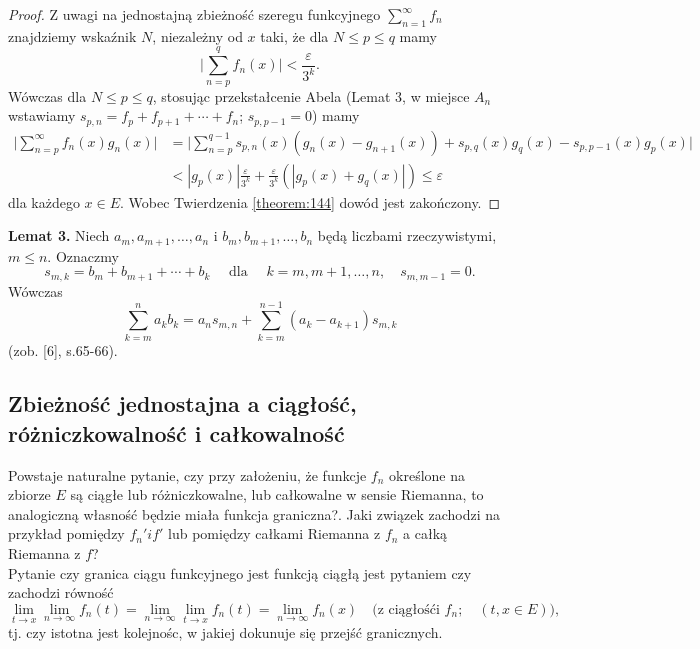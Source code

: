 \documentclass[leqno]{article}
\begin{document}
\begin{justify}
\begin{proof}
    Z uwagi na jednostajną zbieżność szeregu funkcyjnego $\sum\limits_{n=1}^{\infty}f_n$ znajdziemy wskaźnik $N$, niezależny od $x$ taki, że dla $N \leqslant p \leqslant q$ mamy
    \[
        \Bigg|\sum_{n=p}^{q}f_n(x)\Bigg| < \frac{\varepsilon}{3^k}.
    \]
    Wówczas dla $N \leqslant p \leqslant q$, stosując przekstałcenie Abela (Lemat 3, w miejsce $A_n$ wstawiamy $s_{p,n} = f_p + f_{p+1} + \cdots + f_n$; $s_{p,{p-1}} = 0$) mamy
    \begin{align*}
        \Bigg|\sum_{n=p}^{\infty}f_n(x)g_n(x)\Bigg| &= \Bigg|\sum_{n=p}^{q-1}s_{p,n}(x)(g_n(x) - g_{n+1}(x)) + s_{p, q}(x)g_q(x) - s_{p, p-1}(x)g_p(x) \Bigg| \\
                                                    &< |g_p(x)|\frac{\varepsilon}{3^k} + \frac{\varepsilon}{3^k}(|g_p(x) + g_q(x)|) \leqslant \varepsilon
    \end{align*}
    dla każdego $x \in E$. Wobec Twierdzenia \ref{theorem:144} dowód jest zakończony.
\end{proof}

\noindent
\textbf{Lemat 3.}
Niech $a_m, a_{m+1}, \ldots, a_n$ i $b_m, b_{m+1}, \ldots, b_n$ będą liczbami rzeczywistymi, $m \leqslant n$. Oznaczmy
\begin{equation*}
    s_{m,k} = b_m + b_{m+1} + \cdots + b_k \quad \text{ dla } \quad k = m, m+1, \ldots, n, \quad s_{m,{m-1}} = 0. 
\end{equation*}
Wówczas
\[
    \sum_{k=m}^{n}a_k b_k = a_n s_{m,n} + \sum_{k=m}^{n-1}(a_k - a_{k+1})s_{m, k}
\]
(zob. [6], s.65-66).

\newpage
\subsection{Zbieżność jednostajna a ciągłość, różniczkowalność i całkowalność}

Powstaje naturalne pytanie, czy przy założeniu, że funkcje $f_n$ określone na zbiorze $E$ są
ciągłe lub różniczkowalne, lub całkowalne w sensie Riemanna, to analogiczną własność będzie miała funkcja graniczna?.
Jaki związek zachodzi na przykład pomiędzy $f_n' i f'$ lub pomiędzy całkami Riemanna z $f_n$ a całką Riemanna z $f$? \\
Pytanie czy granica ciągu funkcyjnego jest funkcją ciągłą jest pytaniem czy zachodzi równość 
\[
    \lim\limits_{t \to x} \lim\limits_{n \to \infty}f_n(t) = \lim\limits_{n \to \infty}\lim\limits_{t \to x}f_n(t) = \lim\limits_{n \to \infty}f_n(x) 
    \quad \text{(z ciągłośći } f_n; \quad (t, x \in E) \text{)},
\] 
tj. czy istotna jest kolejnośc, w jakiej dokunuje się przejść granicznych.


\end{justify}
\end{document}
